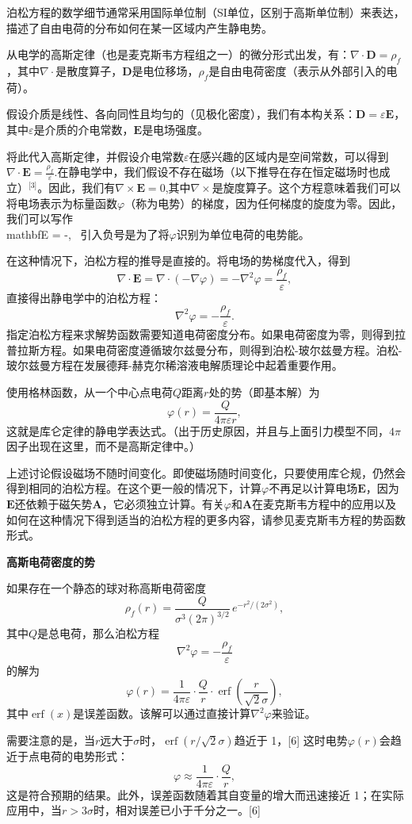泊松方程的数学细节通常采用国际单位制（SI单位，区别于高斯单位制）来表达，描述了自由电荷的分布如何在某一区域内产生静电势。

从电学的高斯定律（也是麦克斯韦方程组之一）的微分形式出发，有：\(\nabla \cdot \mathbf{D} = \rho_f\)，其中\(\nabla \cdot\)是散度算子，\(\mathbf{D}\)是电位移场，\(\rho_f\)是自由电荷密度（表示从外部引入的电荷）。

假设介质是线性、各向同性且均匀的（见极化密度），我们有本构关系：\(\mathbf{D} = \varepsilon \mathbf{E}\)，其中\(\varepsilon\)是介质的介电常数，\(\mathbf{E}\)是电场强度。

将此代入高斯定律，并假设介电常数\(\varepsilon\)在感兴趣的区域内是空间常数，可以得到\(\nabla \cdot \mathbf{E} = \frac{\rho_f}{\varepsilon}\).在静电学中，我们假设不存在磁场（以下推导在存在恒定磁场时也成立）\(^\text{[3]}\)。因此，我们有\(\nabla \times \mathbf{E} = 0\),其中\(\nabla \times\)是旋度算子。这个方程意味着我们可以将电场表示为标量函数\(\varphi\)（称为电势）的梯度，因为任何梯度的旋度为零。因此，我们可以写作\\mathbf{E} = -\nabla \varphi,~
\]  
引入负号是为了将\(\varphi\)识别为单位电荷的电势能。

在这种情况下，泊松方程的推导是直接的。将电场的势梯度代入，得到  
\[
\nabla \cdot \mathbf{E} = \nabla \cdot (-\nabla \varphi) = -\nabla^2 \varphi = \frac{\rho_f}{\varepsilon},~
\]  
直接得出静电学中的泊松方程：
\[
\nabla^2 \varphi = -\frac{\rho_f}{\varepsilon}.~
\]
指定泊松方程来求解势函数需要知道电荷密度分布。如果电荷密度为零，则得到拉普拉斯方程。如果电荷密度遵循玻尔兹曼分布，则得到泊松-玻尔兹曼方程。泊松-玻尔兹曼方程在发展德拜-赫克尔稀溶液电解质理论中起着重要作用。

使用格林函数，从一个中心点电荷\(Q\)距离\(r\)处的势（即基本解）为  
\[
\varphi(r) = \frac{Q}{4\pi \varepsilon r},~
\]  
这就是库仑定律的静电学表达式。（出于历史原因，并且与上面引力模型不同，\(4\pi\)因子出现在这里，而不是高斯定律中。）

上述讨论假设磁场不随时间变化。即使磁场随时间变化，只要使用库仑规，仍然会得到相同的泊松方程。在这个更一般的情况下，计算\(\varphi\)不再足以计算电场\(\mathbf{E}\)，因为\(\mathbf{E}\)还依赖于磁矢势\(\mathbf{A}\)，它必须独立计算。有关\(\varphi\)和\(\mathbf{A}\)在麦克斯韦方程中的应用以及如何在这种情况下得到适当的泊松方程的更多内容，请参见麦克斯韦方程的势函数形式。

\textbf{高斯电荷密度的势}

如果存在一个静态的球对称高斯电荷密度  
\[
\rho_f(r) = \frac{Q}{\sigma^3 (2\pi)^{3/2}}\, e^{-r^2 / (2\sigma^2)},~
\]  
其中\(Q\)是总电荷，那么泊松方程  
\[
\nabla^2 \varphi = -\frac{\rho_f}{\varepsilon}~
\]  
的解为  
\[
\varphi(r) = \frac{1}{4\pi \varepsilon} \cdot \frac{Q}{r} \cdot \operatorname{erf} \left( \frac{r}{\sqrt{2}\sigma} \right),~
\]  
其中\(\operatorname{erf}(x)\)是误差函数。该解可以通过直接计算\(\nabla^2 \varphi\)来验证。

需要注意的是，当\(r\)远大于\(\sigma\)时，\(\operatorname{erf}(r / \sqrt{2} \sigma)\)趋近于 1，[6] 这时电势\(\varphi(r)\)会趋近于点电荷的电势形式：
\[
\varphi \approx \frac{1}{4\pi \varepsilon} \cdot \frac{Q}{r},~
\]  
这是符合预期的结果。此外，误差函数随着其自变量的增大而迅速接近 1；在实际应用中，当\(r > 3\sigma\)时，相对误差已小于千分之一。[6]